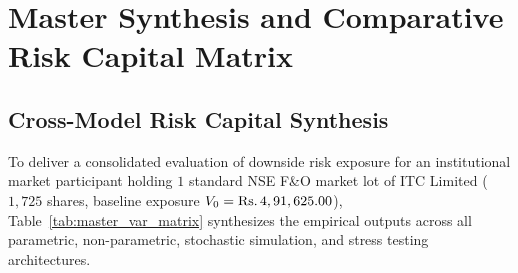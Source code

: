 
\section{Master Synthesis and Comparative Risk Capital Matrix}
\label{sec:master_synthesis}

\subsection{Cross-Model Risk Capital Synthesis}

To deliver a consolidated evaluation of downside risk exposure for an institutional market participant holding $1$ standard NSE F\&O market lot of ITC Limited ($1,725$ shares, baseline exposure $V_0 = \text{\text{Rs.}\,}4,91,625.00$), Table~\ref{tab:master_var_matrix} synthesizes the empirical outputs across all parametric, non-parametric, stochastic simulation, and stress testing architectures.

